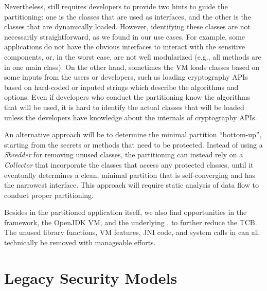 Nevertheless, \civet{} still requires developers to provide two hints
to guide the partitioning:
one is the classes that are used as interfaces,
and the other is the classes that are dynamically loaded.
However, identifying these classes are not necessarily straightforward,
as we found in our use cases.
For example, some applications do not have the obvious interfaces
to interact with the sensitive components,
or, in the worst case, are not well modularized (e.g., all methods are in one main class).
On the other hand,
sometimes the \java{} VM loads classes based on some inputs from the users or developers,
such as loading cryptography APIs based on hard-coded or inputed strings
which describe the algorithms and options.
Even if developers who conduct the partitioning know the algorithms that will be used,
it is hard to identify the actual classes that will be loaded
unless the developers have knowledge about the internals of cryptography APIs.


An alternative approach will be to determine the minimal partition ``bottom-up'',
starting from the secrets or methods that need to be protected.
Instead of using a \emph{Shredder} for removing unused classes,
the partitioning can instead rely on a \emph{Collector} that incorporate the classes
that access any protected classes,
until it eventually determines a clean,
minimal partition
that is self-converging and has the narrowest interface.
This approach will require static analysis of data flow to conduct proper partitioning.

Besides in the partitioned application itself,
we also find opportunities in the \civet{} framework, the OpenJDK \java{} VM,
and the underlying \graphene{} \libos{},
to further reduce the TCB.
The unused library functions, \java{} VM features, JNI code, and system calls in \graphene{}
can all technically be removed with manageable efforts.


\section{Legacy Security Models}
\label{sec:future:security}



